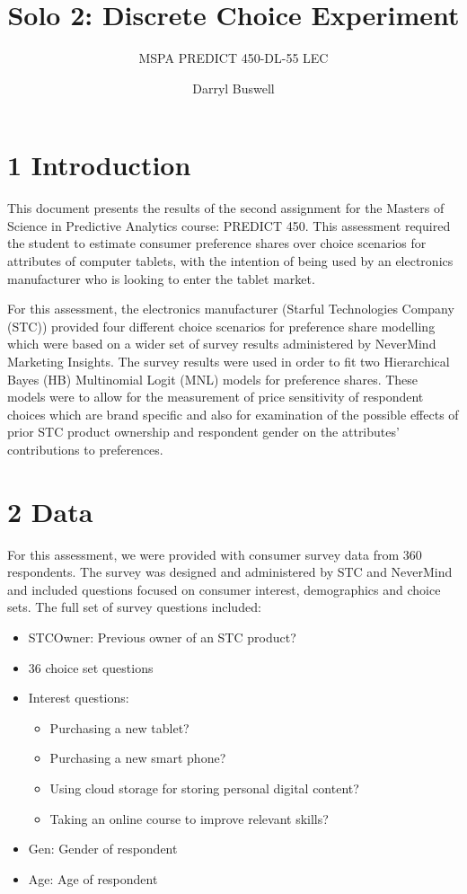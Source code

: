 \documentclass[]{article}
\title{Solo 2: Discrete Choice Experiment}
\subtitle{MSPA PREDICT 450-DL-55 LEC}
\author{Darryl Buswell}
\date{}
\providecommand{\tightlist}{%
  \setlength{\itemsep}{0pt}\setlength{\parskip}{0pt}}
\begin{document}
\maketitle

\section{1 Introduction}\label{introduction}

This document presents the results of the second assignment for the
Masters of Science in Predictive Analytics course: PREDICT 450. This
assessment required the student to estimate consumer preference shares
over choice scenarios for attributes of computer tablets, with the
intention of being used by an electronics manufacturer who is looking to
enter the tablet market.

For this assessment, the electronics manufacturer (Starful Technologies
Company (STC)) provided four different choice scenarios for preference
share modelling which were based on a wider set of survey results
administered by NeverMind Marketing Insights. The survey results were
used in order to fit two Hierarchical Bayes (HB) Multinomial Logit (MNL)
models for preference shares. These models were to allow for the
measurement of price sensitivity of respondent choices which are brand
specific and also for examination of the possible effects of prior STC
product ownership and respondent gender on the attributes' contributions
to preferences.

\section{2 Data}\label{data}

For this assessment, we were provided with consumer survey data from 360
respondents. The survey was designed and administered by STC and
NeverMind and included questions focused on consumer interest,
demographics and choice sets. The full set of survey questions included:

\begin{itemize}
\tightlist
\item
  STCOwner: Previous owner of an STC product?
\item
  36 choice set questions
\item
  Interest questions:

  \begin{itemize}
  \tightlist
  \item
    Purchasing a new tablet?
  \item
    Purchasing a new smart phone?
  \item
    Using cloud storage for storing personal digital content?
  \item
    Taking an online course to improve relevant skills?
  \end{itemize}
\item
  Gen: Gender of respondent
\item
  Age: Age of respondent
\end{itemize}
\end{document}
